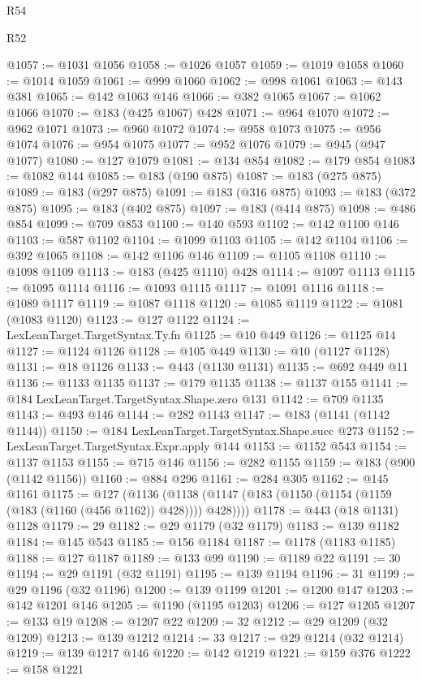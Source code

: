 \begin{lexlean}{R54}
\begin{lexlean}{R52}
\begin{coremodule}
{{{{{{{{{{{{{{{{{{{{{{{{{{{{{{{{{{{{{{{{{{{{{{{{{{{{{{{{{{{{{{{{{{{{{{{{{{{{{{{{{{{{{{{{{{{{{{{{{{{{{{{{{{{{{{{{{{{{{{{{{{{{{{{{{{{{{{{{{{{{{{{{{{{{{{{{{{{{{{{{{{{{{{{{{{{{{{{{{{{{{{{{{{{{{{{{{{{{{{@1057 := @1031 @1056
@1058 := @1026 @1057
@1059 := @1019 @1058
@1060 := @1014 @1059
@1061 := @999 @1060
@1062 := @998 @1061
@1063 := @143 @381
@1065 := @142 @1063 @146
@1066 := @382 @1065
@1067 := @1062 @1066
@1070 := @183 (@425 @1067) @428
@1071 := @964 @1070
@1072 := @962 @1071
@1073 := @960 @1072
@1074 := @958 @1073
@1075 := @956 @1074
@1076 := @954 @1075
@1077 := @952 @1076
@1079 := @945 (@947 @1077)
@1080 := @127 @1079
@1081 := @134 @854
@1082 := @179 @854
@1083 := @1082 @144
@1085 := @183 (@190 @875)
@1087 := @183 (@275 @875)
@1089 := @183 (@297 @875)
@1091 := @183 (@316 @875)
@1093 := @183 (@372 @875)
@1095 := @183 (@402 @875)
@1097 := @183 (@414 @875)
@1098 := @486 @854
@1099 := @709 @853
@1100 := @140 @593
@1102 := @142 @1100 @146
@1103 := @587 @1102
@1104 := @1099 @1103
@1105 := @142 @1104
@1106 := @392 @1065
@1108 := @142 @1106 @146
@1109 := @1105 @1108
@1110 := @1098 @1109
@1113 := @183 (@425 @1110) @428
@1114 := @1097 @1113
@1115 := @1095 @1114
@1116 := @1093 @1115
@1117 := @1091 @1116
@1118 := @1089 @1117
@1119 := @1087 @1118
@1120 := @1085 @1119
@1122 := @1081 (@1083 @1120)
@1123 := @127 @1122
@1124 := LexLeanTarget.TargetSyntax.Ty.fn
@1125 := @10 @449
@1126 := @1125 @14
@1127 := @1124 @1126
@1128 := @105 @449
@1130 := @10 (@1127 @1128)
@1131 := @18 @1126
@1133 := @443 (@1130 @1131)
@1135 := @692 @449 @11
@1136 := @1133 @1135
@1137 := @179 @1135
@1138 := @1137 @155
@1141 := @184 LexLeanTarget.TargetSyntax.Shape.zero @131
@1142 := @709 @1135
@1143 := @493 @146
@1144 := @282 @1143
@1147 := @183 (@1141 (@1142 @1144))
@1150 := @184 LexLeanTarget.TargetSyntax.Shape.succ @273
@1152 := LexLeanTarget.TargetSyntax.Expr.apply @144
@1153 := @1152 @543
@1154 := @1137 @1153
@1155 := @715 @146
@1156 := @282 @1155
@1159 := @183 (@900 (@1142 @1156))
@1160 := @884 @296
@1161 := @284 @305
@1162 := @145 @1161
@1175 := @127
    (@1136 (@1138 (@1147 (@183 (@1150 (@1154 (@1159 (@183 (@1160 (@456 @1162)) @428)))) @428))))
@1178 := @443 (@18 @1131) @1128
@1179 := 29
@1182 := @29 @1179 (@32 @1179)
@1183 := @139 @1182
@1184 := @145 @543
@1185 := @156 @1184
@1187 := @1178 (@1183 @1185)
@1188 := @127 @1187
@1189 := @133 @99
@1190 := @1189 @22
@1191 := 30
@1194 := @29 @1191 (@32 @1191)
@1195 := @139 @1194
@1196 := 31
@1199 := @29 @1196 (@32 @1196)
@1200 := @139 @1199
@1201 := @1200 @147
@1203 := @142 @1201 @146
@1205 := @1190 (@1195 @1203)
@1206 := @127 @1205
@1207 := @133 @19
@1208 := @1207 @22
@1209 := 32
@1212 := @29 @1209 (@32 @1209)
@1213 := @139 @1212
@1214 := 33
@1217 := @29 @1214 (@32 @1214)
@1219 := @139 @1217 @146
@1220 := @142 @1219
@1221 := @159 @376
@1222 := @158 @1221
}}}}}}}}}}}}}}}}}}}}}}}}}}}}}}}}}}}}}}}}}}}}}}}}}}}}}}}}}}}}}}}}}}}}}}}}}}}}}}}}}}}}}}}}}}}}}}}}}}}}}}}}}}}}}}}}}}}}}}}}}}}}}}}}}}}}}}}}}}}}}}}}}}}}}}}}}}}}}}}}}}}}}}}}}}}}}}}}}}}}}}}}}}}}}}}}}}}}}}
\end{coremodule}
\end{lexlean}
\end{lexlean}
